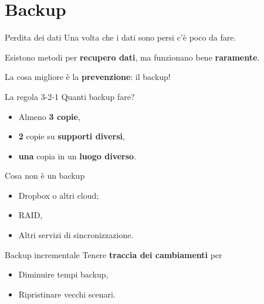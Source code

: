 
\section{Backup}

\begin{myframe}{Perdita dei dati}
  Una volta che i dati sono persi c'è poco da fare.

  Esistono metodi per \textbf{recupero dati}, ma funzionano bene \textbf{raramente}.

  La cosa migliore è la \textbf{prevenzione}: il backup!
\end{myframe}

\begin{myframe}{La regola 3-2-1}
  Quanti backup fare?
  \pause
  \begin{itemize}[<+->]
    \item Almeno \textbf{3 copie},
    \item \textbf{2} copie su \textbf{supporti diversi},
    \item \textbf{una} copia in un \textbf{luogo diverso}.
  \end{itemize}

  \medskip
\end{myframe}

\begin{myframe}{Cosa non è un backup}
  \begin{itemize}[<+->]
    \item Dropbox o altri cloud;
    \item RAID,
    \item Altri servizi di sincronizzazione.
  \end{itemize}
  \medskip
\end{myframe}

\begin{myframe}{Backup incrementale}
  Tenere \textbf{traccia dei cambiamenti} per
  \begin{itemize}
    \item Diminuire tempi backup,
    \item Ripristinare vecchi scenari.
  \end{itemize}
\end{myframe}





